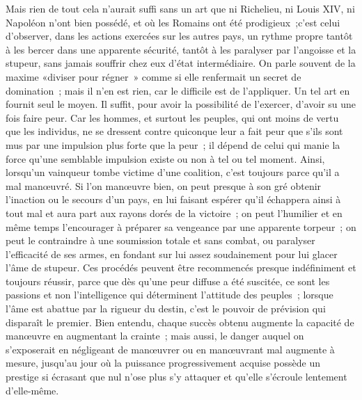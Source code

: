 \documentclass[french,twoside]{book} %
\begin{document}
Mais rien de tout cela n'aurait suffi sans un art que ni Richelieu, ni Louis XIV, ni Napoléon n'ont bien possédé, et où les Romains ont été prodi­gieux ;c'est celui d'observer, dans les actions exercées sur les autres pays, un rythme propre tantôt à les bercer dans une apparente sécurité, tantôt à les paralyser par l'angoisse et la stupeur, sans jamais souffrir chez eux d'état intermédiaire. On parle souvent de la maxime «diviser pour régner » comme si elle renfermait un secret de domination ; mais il n'en est rien, car le difficile est de l'appliquer. Un tel art en fournit seul le moyen. Il suffit, pour avoir la possibilité de l'exercer, d'avoir su une fois faire peur. Car les hommes, et surtout les peuples, qui ont moins de vertu que les individus, ne se dressent contre quiconque leur a fait peur que s'ils sont mus par une impulsion plus forte que la peur ; il dépend de celui qui manie la force qu'une semblable impulsion existe ou non à tel ou tel moment. Ainsi, lorsqu'un vainqueur tombe victime d'une coalition, c'est toujours parce qu'il a mal manœuvré. Si l'on manœuvre bien, on peut presque à son gré obtenir l'inaction ou le secours d'un pays, en lui faisant espérer qu'il échappera ainsi à tout mal et aura part aux rayons dorés de la victoire ; on peut l'humilier et en même temps l'encourager à préparer sa vengeance par une apparente torpeur ; on peut le contraindre à une soumission totale et sans combat, ou paralyser l'efficacité de ses armes, en fondant sur lui assez soudainement pour lui glacer l'âme de stupeur. Ces procédés peuvent être recommencés presque indéfiniment et toujours réussir, parce que dès qu'une peur diffuse a été suscitée, ce sont les passions et non l'intelligence qui déterminent l'attitude des peuples ; lorsque l'âme est abattue par la rigueur du destin, c'est le pouvoir de prévision qui disparaît le premier. Bien entendu, chaque succès obtenu augmente la capacité de manœuvre en augmentant la crainte ; mais aussi, le danger auquel on s'exposerait en négli­geant de manœuvrer ou en manœuvrant mal augmente à mesure, jusqu'au jour où la puissance progressivement acquise possède un prestige si écrasant que nul n'ose plus s'y attaquer et qu'elle s'écroule lentement d'elle-même.\par
\end{document}
